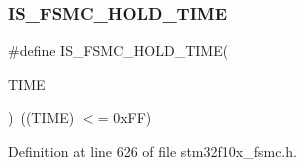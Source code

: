 \subsubsection{\texorpdfstring{I\+S\+\_\+\+F\+S\+M\+C\+\_\+\+H\+O\+L\+D\+\_\+\+T\+I\+ME}{IS\_FSMC\_HOLD\_TIME}}
{\footnotesize\ttfamily \#define I\+S\+\_\+\+F\+S\+M\+C\+\_\+\+H\+O\+L\+D\+\_\+\+T\+I\+ME(\begin{DoxyParamCaption}\item[{}]{T\+I\+ME }\end{DoxyParamCaption})~((T\+I\+ME) $<$= 0x\+F\+F)}



Definition at line 626 of file stm32f10x\+\_\+fsmc.\+h.

